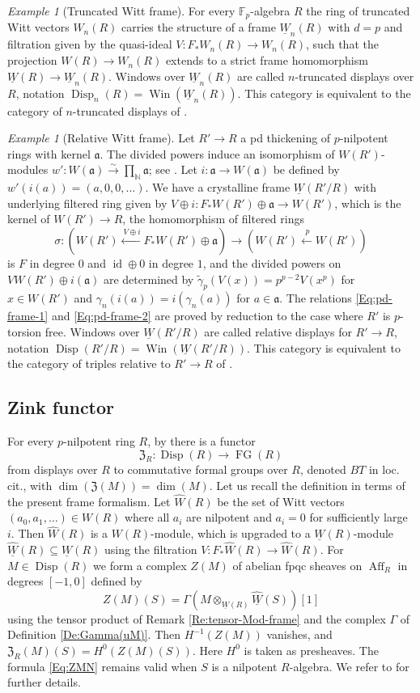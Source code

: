 \documentclass[a4paper,11pt]{amsart}
\theoremstyle{plain}
\theoremstyle{definition}
\theoremstyle{remark}
\newtheorem{Example}[equation]{Example}
\newcommand{\bEx}{\begin{Example}}
\newcommand{\eEx}{\end{Example}}
\newcommand{\beqn}{\begin{equation}}
\newcommand{\eeqn}{\end{equation}}
\renewcommand{\u}{\underline}
\newcommand{\uM}{M} %
\numberwithin{equation}{section}
\newcommand{\Fa}{\mathfrak{a}}
\newcommand{\FZ}{\mathfrak{Z}}
\newcommand{\FF}{{\mathbb{F}}}
\newcommand{\NN}{{\mathbb{N}}}
\DeclareMathOperator{\id}{id}
\DeclareMathOperator{\Aff}{Aff}
\DeclareMathOperator{\Disp}{Disp}
\DeclareMathOperator{\FG}{FG}
\DeclareMathOperator{\Win}{Win}
\begin{document}
\bEx
[Truncated Witt frame]
\label{Ex:Witt-frame-n}
For every $\FF_p$-algebra $R$ the ring of truncated Witt vectors $W_n(R)$ carries the structure of a frame $\u {W\!}_n(R)$ with $d=p$ and filtration given by the quasi-ideal $V\colon F_*W_n(R)\to W_n(R)$, such that the projection $W(R)\to W_n(R)$ extends to a strict frame homomorphism $\u W(R)\to\u {W\!}_n(R)$. 
Windows over $\u {W\!}_n(R)$ are called $n$-truncated displays over $R$, notation $\Disp_n(R)=\Win(\u{W\!}_n(R))$. This category is equivalent to the category of $n$-truncated displays of \cite{Lau:Smoothness}.
\eEx

\bEx
[Relative Witt frame]
\label{Ex:Witt-frame-rel}
Let $R'\to R$  a pd thickening of $p$-nilpotent rings with kernel $\Fa$.
The divided powers induce an isomorphism of $W(R')$-modules $w'\colon W(\Fa)\xrightarrow\sim\prod_{\NN}\Fa$; see \cite[(48)]{Zink:The-display}. Let $i\colon \Fa\to W(\Fa)$ be defined by $w'(i(a))=(a,0,0,\ldots)$. 
We have a crystalline frame $\u W(R'/R)$ with underlying filtered ring given by $V\oplus i\colon F_*W(R')\oplus\Fa\to W(R')$, 
which is the kernel of $W(R')\to R$, the homomorphism of filtered rings
\[
\sigma\colon (W(R')\xleftarrow{\:V\oplus i}F_*W(R')\oplus \Fa)\longrightarrow(W(R')\xleftarrow{\: p} W(R'))
\] 
is $F$ in degree $0$ and ${\id}\oplus 0$ in degree $1$, and the divided powers on $VW(R')\oplus i(\Fa)$ are determined by $\tilde\gamma_p(V(x))=p^{p-2}V(x^p)$ for $x\in W(R')$ and $\gamma_n(i(a))=i(\gamma_n(a))$ for $a\in\Fa$. The relations \eqref{Eq:pd-frame-1} and \eqref{Eq:pd-frame-2} are proved by reduction to the case where $R'$ is $p$-torsion free. Windows over $\u W(R'/R)$ are called relative displays for $R'\to R$, notation $\Disp(R'/R)=\Win(\u W(R'/R))$. This category is equivalent to the category of triples relative to $R'\to R$ of \cite[\S 2.2]{Zink:The-display}.
\eEx

\subsection{Zink functor}
\label{Se:Recall-Zink-functor}

For every $p$-nilpotent ring $R$, by \cite{Zink:The-display} there is a functor 
\beqn
\label{Eq:FZR-DispR-LGR}
\FZ_R:\Disp(R)\to\FG(R)
\eeqn
from displays over $R$ to commutative formal groups over $R$, denoted $BT$ in loc.\,cit., with $\dim(\FZ(\uM))=\dim(\uM)$. Let us recall the definition in terms of the present frame formalism. 
Let $\hat W(R)$ be the set of Witt vectors $(a_0,a_1,\ldots)\in W(R)$ where all $a_i$ are nilpotent and $a_i=0$ for sufficiently large $i$. Then $\hat W(R)$ is a $W(R)$-module, which is upgraded to a $\u W(R)$-module $\u{\hat W}(R)\subseteq\u W(R)$ using the filtration $V\colon F_*\hat W(R)\to\hat W(R)$. For $\uM\in\Disp(R)$ we form a complex $Z(\uM)$ of abelian fpqc sheaves on $\Aff_R$ in degrees $[-1,0]$ defined by
\beqn
\label{Eq:ZMN}
Z(\uM)(S)=\Gamma(\uM\otimes_{\u W(R)}\u{\hat W}(S))[1]
\eeqn
using the tensor product of Remark \ref{Re:tensor-Mod-frame} and the complex $\Gamma$ of Definition \ref{De:Gamma(uM)}.
Then $H^{-1}(Z(\uM))$ vanishes, and $\FZ_R(\uM)(S)=H^0(Z(M)(S))$. Here $H^0$ is taken as presheaves. The formula \eqref{Eq:ZMN} remains valid when $S$ is a nilpotent $R$-algebra.  We refer to \cite[\S11]{Lau:Gerbe} for further details.
\end{document}
